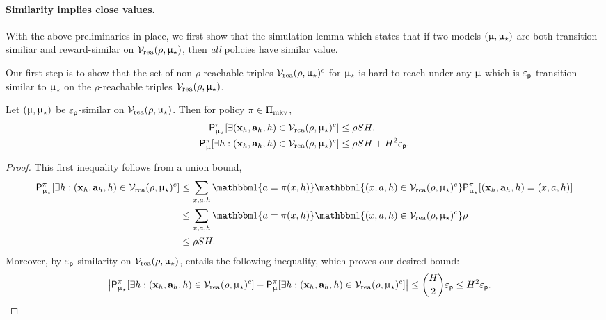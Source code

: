 \paragraph{Similarity implies close values.} With the above preliminaries in place, we first show that the simulation lemma which states that if two models $(\upmu,\upmu_{\star})$ are both transition-similiar and reward-similar on $\mathcal{V}_{\mathrm{rea}}(\rho,\upmu_{\star})$, then \emph{all} policies have similar value.

Our first step is to show that the set of non-$\rho$-reachable triples $\mathcal{V}_{\mathrm{rea}}(\rho,\upmu_{\star})^c$ for $\upmu_{\star}$ is hard to reach under any $\upmu$ which is $\varepsilon_{\mathsf{p}}$-transition-similar to $\upmu_{\star}$ on the $\rho$-reachable triples $\mathcal{V}_{\mathrm{rea}}(\rho,\upmu_{\star})$.
\begin{lemma}\label{lem:mass_of_reachable} Let $(\upmu,\upmu_{\star})$ be $\varepsilon_{\mathsf{p}}$-similar on $\mathcal{V}_{\mathrm{rea}}(\rho,\upmu_{\star})$. Then for policy $\pi \in \Pi_{\mathrm{mkv}}$,
\begin{align*}
\mathsf{P}^\pi_{\upmu_{\star}}[\exists (\mathbf{x}_h,\mathbf{a}_h,h) \in \mathcal{V}_{\mathrm{rea}}(\rho,\upmu_{\star})^c] &\le \rho SH.\\
\mathsf{P}^\pi_{\upmu}[\exists h : (\mathbf{x}_h,\mathbf{a}_h,h) \in \mathcal{V}_{\mathrm{rea}}(\rho,\upmu_{\star})^c] &\le \rho SH + H^2\varepsilon_{\mathsf{p}}.
\end{align*}
\end{lemma}
\begin{proof} This first inequality follows from a union bound,
\begin{align*}
\sfP^\pi_{\modst}[\exists h : (\bmx_h,\bma_h,h) \in \Vreach(\rho,\modst)^c] &\le \sum_{x,a,h} \ind\{a = \pi(x,h)\} \ind\{(x,a,h) \in \Vreach(\rho,\modst)^c\}\sfP^\pi_{\modst}[ (\bmx_h,\bma_h,h) = (x,a,h)]\\
&\le \sum_{x,a,h} \ind\{a = \pi(x,h)\} \ind\{(x,a,h) \in \Vreach(\rho,\modst)^c\} \rho\\
&\le \rho SH.
\end{align*}
Moreover, by $\varepsilon_{\mathsf{p}}$-similarity on $\mathcal{V}_{\mathrm{rea}}(\rho,\upmu_{\star})$,  entails the following inequality, which proves our desired bound:
\begin{align*}
\left|\mathsf{P}^\pi_{\upmu_{\star}}[\exists h : (\mathbf{x}_h,\mathbf{a}_h,h) \in \mathcal{V}_{\mathrm{rea}}(\rho,\upmu_{\star})^c] - \mathsf{P}^\pi_{\upmu}[\exists h : (\mathbf{x}_h,\mathbf{a}_h,h) \in \mathcal{V}_{\mathrm{rea}}(\rho,\upmu_{\star})^c]\right| \le \binom{H}{2}\varepsilon_{\mathsf{p}} \le H^2 \varepsilon_{\mathsf{p}}. \quad\qedhere
\end{align*}
\end{proof}

